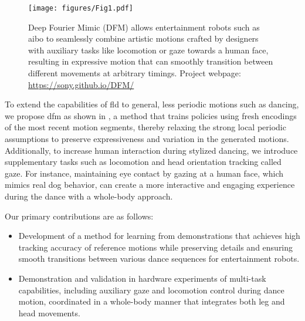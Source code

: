 \begin{figure}[!t]
    \centering
    \texttt{[image: figures/Fig1.pdf]}
    \caption{Deep Fourier Mimic (DFM) allows entertainment robots such as aibo to seamlessly combine artistic motions crafted by designers with auxiliary tasks like locomotion or gaze towards a human face, resulting in expressive motion that can smoothly transition between different movements at arbitrary timings. Project webpage: \url{https://sony.github.io/DFM/}}
    \label{fig:dfm_concept}
    \vspace{-3ex}
\end{figure}

To extend the capabilities of \ac{fld} to general, less periodic motions such as dancing, we propose \ac{dfm} as shown in , a method that trains policies using fresh encodings of the most recent motion segments, thereby relaxing the strong local periodic assumptions to preserve expressiveness and variation in the generated motions.
Additionally, to increase human interaction during stylized dancing, we introduce supplementary tasks such as locomotion and head orientation tracking called gaze.
For instance, maintaining eye contact by gazing at a human face, which mimics real dog behavior, can create a more interactive and engaging experience during the dance with a whole-body approach.

Our primary contributions are as follows:
\begin{itemize}
\item Development of a method for learning from demonstrations that achieves high tracking accuracy of reference motions while preserving details and ensuring smooth transitions between various dance sequences for entertainment robots.
\item Demonstration and validation in hardware experiments of multi-task capabilities, including auxiliary gaze and locomotion control during dance motion, coordinated in a whole-body manner that integrates both leg and head movements.
\end{itemize}
